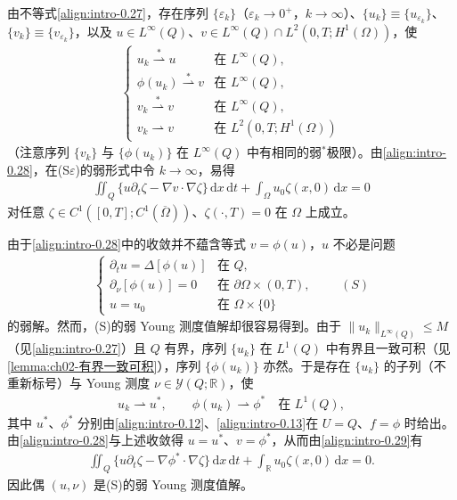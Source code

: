 \documentclass[../main.tex]{subfiles}
\begin{document}
由不等式\eqref{align:intro-0.27}，存在序列 $\{\varepsilon_k\}$（$\varepsilon_k\to0^+$，$k\to\infty$）、$\{u_k\}\equiv\{u_{\varepsilon_k}\}$、$\{v_k\}\equiv\{v_{\varepsilon_k}\}$，以及 $u\in L^\infty(Q)$、$v\in L^\infty(Q)\cap L^2(0,T;H^1(\Omega))$，使
\begin{align}
\begin{cases}
u_k \stackrel{*}{\rightharpoonup} u & \text{在 }L^\infty(Q),\\
\phi(u_k) \stackrel{*}{\rightharpoonup} v & \text{在 }L^\infty(Q),\\
v_k \stackrel{*}{\rightharpoonup} v & \text{在 }L^\infty(Q),\\
v_k \rightharpoonup v & \text{在 }L^2(0,T;H^1(\Omega))
\end{cases}
\label{align:intro-0.28}
\end{align}
（注意序列 $\{v_k\}$ 与 $\{\phi(u_k)\}$ 在 $L^\infty(Q)$ 中有相同的弱$^*$极限）。由\eqref{align:intro-0.28}，在(S$\varepsilon$)的弱形式中令 $k\to\infty$，易得
\begin{align}
\iint_Q\{u\partial_t\zeta - \nabla v\cdot\nabla\zeta\}\,\mathrm{d}x\,\mathrm{d}t
+ \int_\Omega u_0\zeta(x,0)\,\mathrm{d}x = 0 \label{align:intro-0.29}
\end{align}
对任意 $\zeta\in C^1([0,T];C^1(\overline\Omega))$、$\zeta(\cdot,T)=0$ 在 $\Omega$ 上成立。

由于\eqref{align:intro-0.28}中的收敛并不蕴含等式 $v=\phi(u)$，$u$ 不必是问题
\begin{align*}
\begin{cases}
\partial_t u = \Delta[\phi(u)] & \text{在 }Q,\\
\partial_\nu[\phi(u)] = 0 & \text{在 }\partial\Omega\times(0,T),\\
u=u_0 & \text{在 }\Omega\times\{0\}
\end{cases}
\qquad(S)
\end{align*}
的弱解。然而，(S)的弱 Young 测度值解却很容易得到。由于 $\|u_k\|_{L^\infty(Q)}\leqslant M$（见\eqref{align:intro-0.27}）且 $Q$ 有界，序列 $\{u_k\}$ 在 $L^1(Q)$ 中有界且一致可积（见\cref{lemma:ch02-有界一致可积}），序列 $\{\phi(u_k)\}$ 亦然。于是存在 $\{u_k\}$ 的子列（不重新标号）与 Young 测度 $\nu\in\mathcal{Y}(Q;\mathbb{R})$，使
\begin{align*}
u_k\rightharpoonup u^*,\qquad \phi(u_k)\rightharpoonup\phi^* \quad \text{在 }L^1(Q),
\end{align*}
其中 $u^*$、$\phi^*$ 分别由\eqref{align:intro-0.12}、\eqref{align:intro-0.13}在 $U=Q$、$f=\phi$ 时给出。由\eqref{align:intro-0.28}与上述收敛得 $u=u^*$、$v=\phi^*$，从而由\eqref{align:intro-0.29}有
\begin{align}
\iint_Q\{u\partial_t\zeta - \nabla\phi^*\cdot\nabla\zeta\}\,\mathrm{d}x\,\mathrm{d}t
+ \int_{\mathbb{R}}u_0\zeta(x,0)\,\mathrm{d}x = 0. \label{align:intro-0.30}
\end{align}
因此偶 $(u,\nu)$ 是(S)的弱 Young 测度值解。
\end{document}
